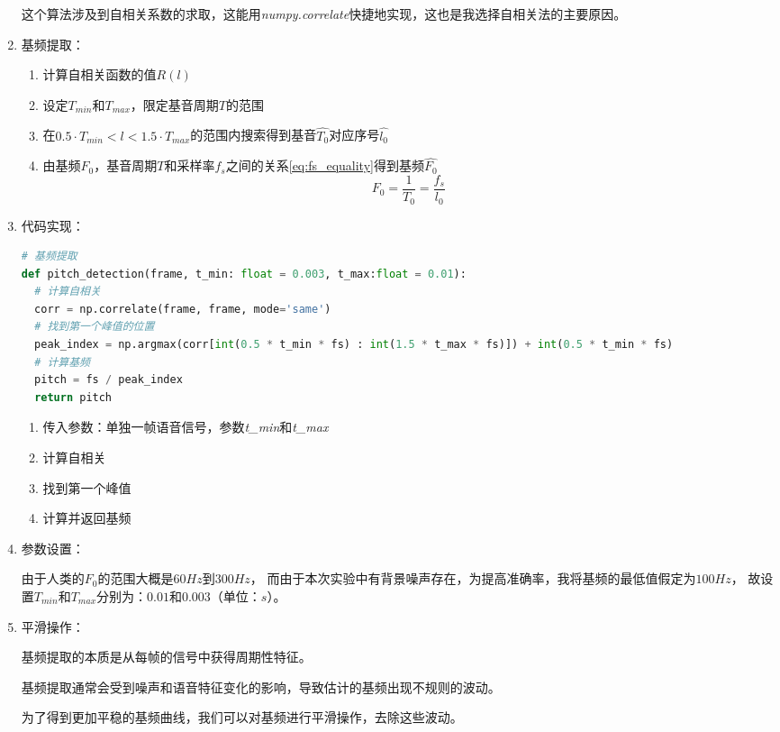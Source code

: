 \documentclass[a4paper]{article}
\begin{document}
\begin{enumerate}
{    这个算法涉及到自相关系数的求取，这能用\emph{numpy.correlate}快捷地实现，这也是我选择自相关法的主要原因。
  }
  \item 
  {
    基频提取：
    \begin{enumerate}
      \item 计算自相关函数的值$R(l)$
      \item 设定$T_{min}$和$T_{max}$，限定基音周期$T$的范围
      \item 在$0.5\cdot T_{min} < l < 1.5\cdot T_{max}$的范围内搜索得到基音$\hat{T_0}$对应序号$\hat{l_0}$
      \item 由基频$F_0$，基音周期$T$和采样率$f_s$之间的关系\ref{eq:fs_equality}得到基频$\hat{F_0}$
      \begin{equation}
        F_0 = \frac{1}{T_0} = \frac{f_s}{l_0}
        \label{eq:fs_equality}
      \end{equation}
    \end{enumerate}
  }
  \item 
  {
    代码实现：
    \begin{lstlisting}[language=python]
# 基频提取
def pitch_detection(frame, t_min: float = 0.003, t_max:float = 0.01):
  # 计算自相关
  corr = np.correlate(frame, frame, mode='same')
  # 找到第一个峰值的位置
  peak_index = np.argmax(corr[int(0.5 * t_min * fs) : int(1.5 * t_max * fs)]) + int(0.5 * t_min * fs)
  # 计算基频
  pitch = fs / peak_index
  return pitch
    \end{lstlisting}
    \begin{enumerate}
      \item 传入参数：单独一帧语音信号，参数\emph{t\_min}和\emph{t\_max}
      \item 计算自相关
      \item 找到第一个峰值
      \item 计算并返回基频
    \end{enumerate}
  }
  \item 
  {
    参数设置：

    由于人类的$F_0$的范围大概是$60Hz$到$300Hz$，
    而由于本次实验中有背景噪声存在，为提高准确率，我将基频的最低值假定为$100Hz$，
    故设置$T_{min}$和$T_{max}$分别为：$0.01$和$0.003$（单位：$s$）。
  }
  \item 
  {
    平滑操作：

    基频提取的本质是从每帧的信号中获得周期性特征。

    基频提取通常会受到噪声和语音特征变化的影响，导致估计的基频出现不规则的波动。

    为了得到更加平稳的基频曲线，我们可以对基频进行平滑操作，去除这些波动。

}
\end{enumerate}
\end{document}
